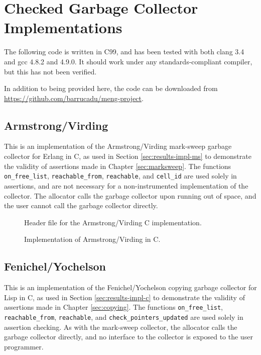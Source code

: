 \chapter{Checked Garbage Collector Implementations}
\label{sec:gc-impl}

\lstset{language=C}

The following code is written in C99, and has been tested with both
clang 3.4 and gcc 4.8.2 and 4.9.0. It should work under any
standards-compliant compiler, but this has not been verified.

In addition to being provided here, the code can be downloaded from
\url{https://github.com/barrucadu/meng-project}.

\section{Armstrong/Virding}
\label{sec:gc-impl-armstrong-virding}

This is an implementation of the Armstrong/Virding\cite{Armstrong95}
mark-sweep garbage collector for Erlang in C, as used in Section
\ref{sec:results-impl-ms} to demonstrate the validity of assertions
made in Chapter \ref{sec:marksweep}. The functions
\texttt{on\_free\_list}, \texttt{reachable\_from}, \texttt{reachable},
and \texttt{cell\_id} are used solely in assertions, and are not
necessary for a non-instrumented implementation of the collector. The
allocator calls the garbage collector upon running out of space, and
the user cannot call the garbage collector directly.


\begin{figure}[H]
  \captionsetup{format=default}
  \caption{Header file for the Armstrong/Virding C implementation.}
  \label{fig:armstrong-virding-h}
\end{figure}


\begin{figure}[H]
  \captionsetup{format=default}
  \caption{Implementation of Armstrong/Virding in C.}
  \label{fig:armstrong-virding-c}
\end{figure}

\section{Fenichel/Yochelson}
\label{sec:gc-impl-fenichel-yochelson}

This is an implementation of the Fenichel/Yochelson\cite{Fenichel69}
copying garbage collector for Lisp in C, as used in Section
\ref{sec:results-impl-c} to demonstrate the validity of assertions
made in Chapter \ref{sec:copying}. The functions
\texttt{on\_free\_list}, \texttt{reachable\_from}, \texttt{reachable},
and \texttt{check\_pointers\_updated} are used solely in assertion
checking. As with the mark-sweep collector, the allocator calls the
garbage collector directly, and no interface to the collector is
exposed to the user programmer.

